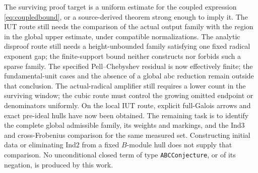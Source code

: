 \documentclass[11pt]{amsart}
\theoremstyle{definition}
\theoremstyle{remark}
\begin{document}
The surviving proof target is a uniform estimate for the coupled expression
\eqref{eq:coupledbound}, or a source-derived theorem strong enough to imply
it. The IUT route still needs the comparison of the actual output family
with the region in the global upper estimate, under compatible
normalizations. The analytic disproof route still
needs a height-unbounded family satisfying one fixed radical exponent gap;
the finite-support bound neither constructs nor forbids such a sparse
family. The specified Pell--Chebyshev residual is now effectively finite;
the fundamental-unit cases and the absence of a global abc reduction remain
outside that conclusion. The actual-radical amplifier still requires a
lower count in the surviving window; the cubic route must control the
growing omitted endpoint or denominators uniformly. On the local IUT
route, explicit full-Galois arrows and exact pre-ideal hulls have now
been obtained. The remaining task is to identify the complete global
admissible family, its weights and markings, and the Ind3 and
cross-Frobenius comparison for the same measured set. Constructing
initial data or eliminating Ind2 from a fixed $B$-module hull does not
supply that comparison. No unconditional closed term
of type \texttt{ABCConjecture}, or of its negation, is produced by this work.
\end{document}
